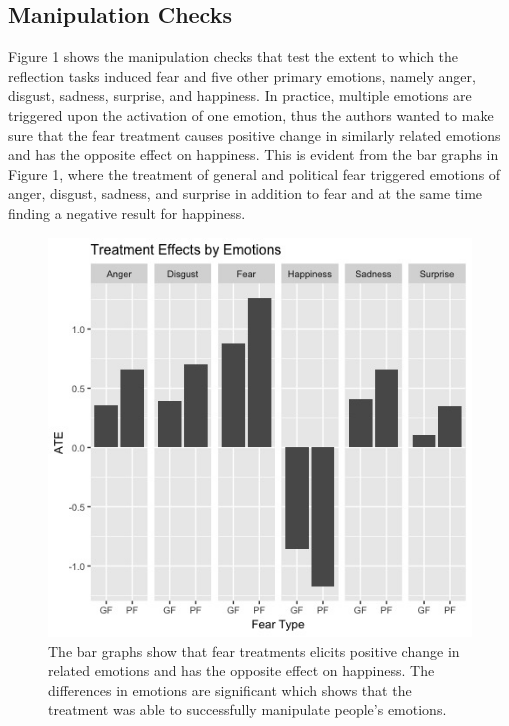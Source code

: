 \documentclass{article}
\begin{document}
\subsection{Manipulation Checks}

Figure 1 shows the manipulation checks that test the extent to which the reflection tasks induced fear and five other primary emotions, namely anger, disgust, sadness, surprise, and happiness. In practice, multiple emotions are triggered upon the activation of one emotion, thus the authors wanted to make sure that the fear treatment causes positive change in similarly related emotions and has the opposite effect on happiness. This is evident from the bar graphs in Figure 1, where the treatment of general and political fear triggered emotions of anger, disgust, sadness, and surprise in addition to fear and at the same time finding a negative result for happiness. 
\clearpage


\begin{figure}[!htbp]
\label{emotions}
\includegraphics[scale=0.9]{Fig1.png}
\caption{The bar graphs show that fear treatments elicits positive change in related emotions and has the opposite effect on happiness. The differences in emotions are significant which shows that the treatment was able to successfully manipulate people's emotions.}
\centering
\end{figure}
\end{document}
